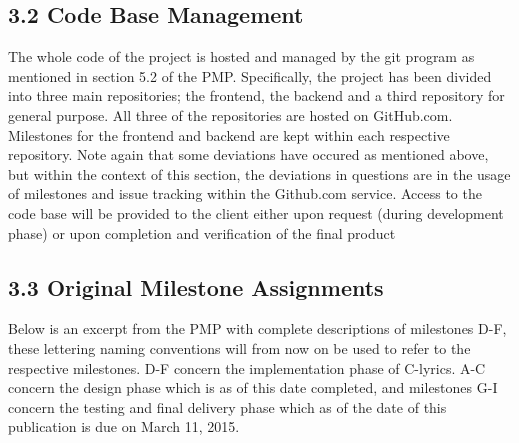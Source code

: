 \documentclass[]{article}
\begin{document}
\subsection{\textbf{3.2 Code Base
Management}}\label{code-base-management}

The whole code of the project is hosted and managed by the git program
as mentioned in section 5.2 of the PMP. Specifically, the project has
been divided into three main repositories; the frontend, the backend and
a third repository for general purpose. All three of the repositories
are hosted on GitHub.com. Milestones for the frontend and backend are
kept within each respective repository. Note again that some deviations
have occured as mentioned above, but within the context of this section,
the deviations in questions are in the usage of milestones and issue
tracking within the Github.com service. Access to the code base will be
provided to the client either upon request (during development phase) or
upon completion and verification of the final product

\subsection{\textbf{3.3 Original Milestone
Assignments}}\label{original-milestone-assignments}

Below is an excerpt from the PMP with complete descriptions of
milestones D-F, these lettering naming conventions will from now on be
used to refer to the respective milestones. D-F concern the
implementation phase of C-lyrics. A-C concern the design phase which is
as of this date completed, and milestones G-I concern the testing and
final delivery phase which as of the date of this publication is due on
March 11, 2015.
\end{document}

